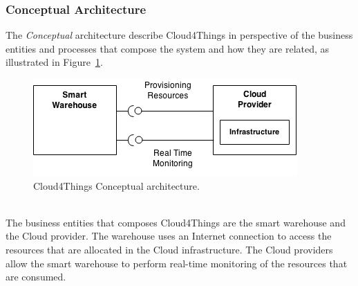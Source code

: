 \subsubsection{Conceptual Architecture}
\label{subs:conceptual_architecture}
The \textit{Conceptual} architecture describe Cloud4Things in perspective of
the business entities and processes that compose the system and how they are related,
as illustrated in Figure~\ref{fig:conceptual_architecture}.
\pagebreak
\begin{figure}[h!]
  \centering
  \includegraphics[width=.8\textwidth]{./images/conceptual-architecture}
  \caption{Cloud4Things Conceptual architecture.}
  \label{fig:conceptual_architecture}
\end{figure}\\
The business entities that composes Cloud4Things are the smart warehouse and the
Cloud provider. The warehouse uses an Internet connection to access the resources
that are allocated in the Cloud infrastructure. The Cloud providers allow the smart
warehouse to perform real-time monitoring of the resources that are consumed.
